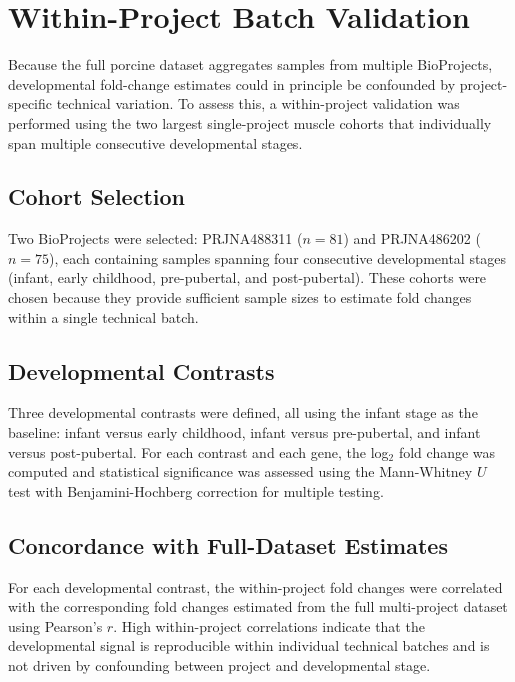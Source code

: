 \section{Within-Project Batch Validation}\label{sec:methods:within_project}

Because the full porcine dataset aggregates samples from multiple BioProjects, developmental fold-change estimates could in principle be confounded by project-specific technical variation. To assess this, a within-project validation was performed using the two largest single-project muscle cohorts that individually span multiple consecutive developmental stages.

\subsection{Cohort Selection}

Two BioProjects were selected: PRJNA488311 ($n = 81$) and PRJNA486202 ($n = 75$), each containing samples spanning four consecutive developmental stages (infant, early childhood, pre-pubertal, and post-pubertal). These cohorts were chosen because they provide sufficient sample sizes to estimate fold changes within a single technical batch.

\subsection{Developmental Contrasts}

Three developmental contrasts were defined, all using the infant stage as the baseline: infant versus early childhood, infant versus pre-pubertal, and infant versus post-pubertal. For each contrast and each gene, the log$_2$ fold change was computed and statistical significance was assessed using the Mann-Whitney $U$ test \parencite{mann_test_1947} with Benjamini-Hochberg correction for multiple testing.

\subsection{Concordance with Full-Dataset Estimates}

For each developmental contrast, the within-project fold changes were correlated with the corresponding fold changes estimated from the full multi-project dataset using Pearson's $r$. High within-project correlations indicate that the developmental signal is reproducible within individual technical batches and is not driven by confounding between project and developmental stage.


